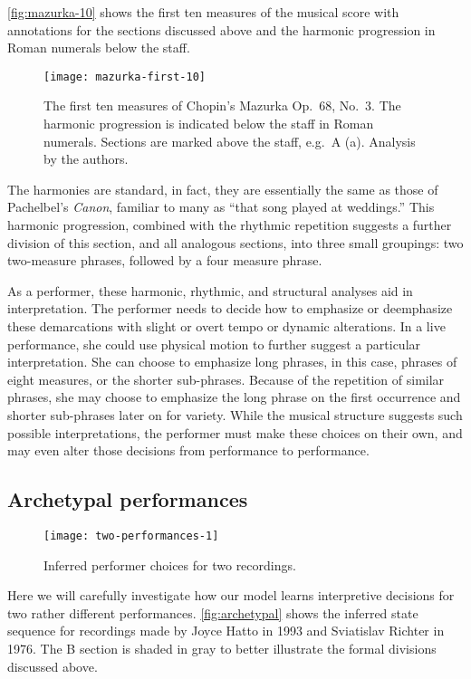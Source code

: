 \documentclass[12pt]{article}
\begin{document}
\autoref{fig:mazurka-10} shows the first ten measures of the musical
score with annotations for the sections discussed above and the
harmonic progression in Roman numerals below the staff. 
\begin{figure}[t]
  \centering
  \texttt{[image: mazurka-first-10]}
  \caption{The first ten measures of Chopin's Mazurka Op.\ 68, No.\
    3. The harmonic progression is indicated below the staff in Roman
    numerals. Sections are marked above the staff, e.g.\ A (a). Analysis by the authors.}
  \label{fig:mazurka-10}
\end{figure}
The harmonies are standard, in fact, they are essentially the same as
those of Pachelbel's {\em Canon}, familiar to many as ``that song
played at weddings.'' This harmonic progression, combined with the
rhythmic repetition suggests a further division of this section, and
all analogous sections, into three small groupings: two two-measure
phrases, followed by a four measure phrase.

As a performer, these harmonic, rhythmic, and structural analyses aid
in interpretation. The performer needs to decide how to emphasize or
deemphasize these demarcations with slight or overt tempo or dynamic
alterations. In a live performance, she could use physical motion to
further suggest a particular interpretation. She can choose to
emphasize long phrases, in this 
case, phrases of eight measures, or the shorter sub-phrases. Because
of the repetition of similar phrases, she may choose to emphasize the
long phrase on the first occurrence and shorter sub-phrases later on
for variety. While the musical structure suggests such
possible interpretations, the performer must make these choices on
their own, and may even alter those decisions from performance to
performance.



\subsection{Archetypal performances}
\label{sec:arch-perf}


\begin{figure}[t]
  \centering
  \texttt{[image: two-performances-1]}
  \caption{Inferred performer choices for two recordings. }
  \label{fig:archetypal}
\end{figure}
Here we will carefully investigate how our model learns interpretive
decisions for two rather different performances. \autoref{fig:archetypal} shows the inferred state sequence for
recordings made by Joyce Hatto in 1993 and Sviatislav Richter in
1976. The B section is
shaded in gray to better illustrate the formal divisions discussed above.
\end{document}
